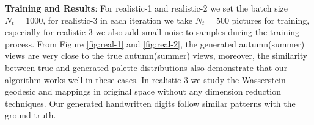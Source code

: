 \documentclass{article}
\begin{document}
\vspace{-0.2em}
\textbf{Training and Results}: For realistic-1 and realistic-2 we set the batch size $N_t=1000$, for realistic-3 in each iteration we take $N_t=500$ pictures for training, especially for realistic-3 we also add small noise to samples during the training process. From Figure \ref{fig:real-1} and \ref{fig:real-2}, the generated autumn(summer) views are very close to the true autumn(summer) views, moreover, the similarity between true and generated palette distributions also demonstrate that our algorithm works well in these cases. In realistic-3 we study the Wasserstein geodesic and mappings in original space without any dimension reduction techniques. Our generated handwritten digits follow similar patterns with the ground truth.



\vspace{-0.6em}
\end{document}
